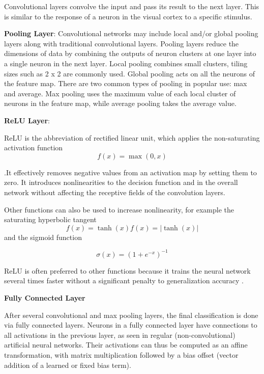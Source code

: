 \documentclass[11pt]{article}
\begin{document}
	Convolutional layers convolve the input and pass its result to the next
	layer. This is similar to the response of a neuron in the visual cortex to a
	specific stimulus.

	\textbf{Pooling Layer}:
	Convolutional networks may include local and/or global pooling layers along
	with traditional convolutional layers. Pooling layers reduce the dimensions
	of data by combining the outputs of neuron clusters at one layer into a
	single neuron in the next layer. Local pooling combines small clusters,
	tiling sizes such as 2 x 2 are commonly used. Global pooling acts on all the
	neurons of the feature map. There are two common types of pooling in popular
	use: max and average. Max pooling uses the maximum value of each local
	cluster of neurons in the feature map, while average pooling takes the
	average value.

	\textbf{ReLU Layer}:

	ReLU is the abbreviation of rectified linear unit, which applies the
	non-saturating activation function
	\begin{equation}
		f ( x ) = \max ( 0 , x )
	\end{equation}

	.It effectively removes
	negative values from an activation map by setting them to zero. It
	introduces nonlinearities to the decision function and in the overall
	network without affecting the receptive fields of the convolution layers.

	Other functions can also be used to increase nonlinearity, for example the
	saturating hyperbolic tangent
	\begin{equation}
	f(x)=\tanh(x)
	f(x) = | \tanh (x) |
	\end{equation}
	and the
	sigmoid function

	\begin{equation}
		\sigma(x) = (1+e^{-x})^{-1}
	\end{equation}

	ReLU is often preferred to other functions because it trains the neural network several
	times faster without a significant penalty to generalization accuracy
	 \cite{relu_layer}.

	\textbf{Fully Connected Layer}

	After several convolutional and max pooling layers, the final classification
	is done via fully connected layers. Neurons in a fully connected layer have
	connections to all activations in the previous layer, as seen in regular
	(non-convolutional) artificial neural networks. Their activations can thus
	be computed as an affine transformation, with matrix multiplication followed
	by a bias offset (vector addition of a learned or fixed bias term).
\end{document}
